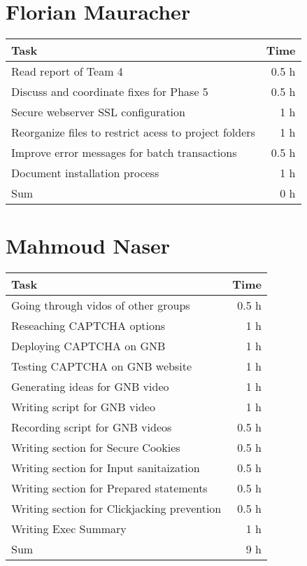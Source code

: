 \section*{Florian Mauracher}
\begin{table}[h!tpb]
  \centering
  \begin{tabularx}{\textwidth}{X r}
    \toprule
      Task & Time \\
    \midrule
      Read report of Team 4 & 0.5 h \\
      Discuss and coordinate fixes for Phase 5  & 0.5 h \\
      Secure webserver SSL configuration & 1 h \\
      Reorganize files to restrict acess to project folders & 1 h \\
      Improve error messages for batch transactions & 0.5 h \\
      Document installation process & 1 h \\
    \midrule
      Sum & 0 h \\
    \bottomrule
  \end{tabularx}
\end{table}

\clearpage
\section*{Mahmoud Naser}
\begin{table}[h!tpb]
  \centering
  \begin{tabularx}{\textwidth}{X r}
    \toprule
      Task & Time \\
    \midrule
      Going through vidos of other groups & 0.5 h \\
      Reseaching CAPTCHA options & 1 h \\
      Deploying CAPTCHA on GNB & 1 h \\
      Testing CAPTCHA on GNB website & 1 h \\
      Generating ideas for GNB video & 1 h \\
      Writing script for GNB video & 1 h \\
      Recording script for GNB videos & 0.5 h\\ 
      Writing section for Secure Cookies & 0.5 h\\
      Writing section for Input sanitaization & 0.5 h\\
      Writing section for Prepared statements & 0.5 h\\
      Writing section for Clickjacking prevention & 0.5 h\\
      Writing Exec Summary & 1 h\\
    \midrule
      Sum & 9 h \\
    \bottomrule
  \end{tabularx}
\end{table}
